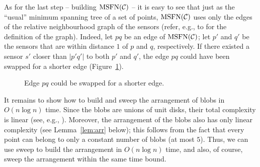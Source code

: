\documentclass[11pt,a4paper]{article}
\newcommand{\myd}[2]{\lvert #1 #2 \rvert}
\newcommand{\MSTN}{\mathrm{MSFN}}
\theoremstyle{definition}
\theoremstyle{remark}
\begin{document}
As for the last step -- building $\MSTN(\myC)$ -- it is easy to see that just as the ``usual'' minimum spanning tree of a set of points, $\MSTN(\myC)$ uses only the edges of the relative neighbourhood graph of the sensors (refer, e.g., to \citet[p.~217]{berg08computational} for the definition of the graph).
Indeed, let $pq$ be an edge of $\MSTN(\myC)$; let $p'$ and $q'$ be the sensors that are within distance $1$ of $p$ and $q$, respectively. If there existed a sensor $s'$ closer than $\myd{p'}{q'}$ to both $p'$ and $q'$, the edge $pq$ could have been swapped for a shorter edge (Figure~\ref{fig:nlogn}).
\begin{figure}[ht]
\centering
{}
\caption{Edge $pq$ could be swapped for a shorter edge.}\label{fig:nlogn}
\end{figure}

It remains to show how to build and sweep the arrangement of blobs in $O(n\log n)$ time.
Since the blobs are unions of unit disks, their total complexity is linear (see, e.g., \citet[Theorem~13.9]{berg08computational}). Moreover, the arrangement of the blobs also has only linear complexity (see Lemma~\ref{lem:arr} below); this follows from the fact that every point can belong to only a constant number of blobs (at most $5$). Thus, we can use sweep to build the arrangement in $O(n\log n)$ time, and also, of course, sweep the arrangement within the same time bound.
\end{document}
